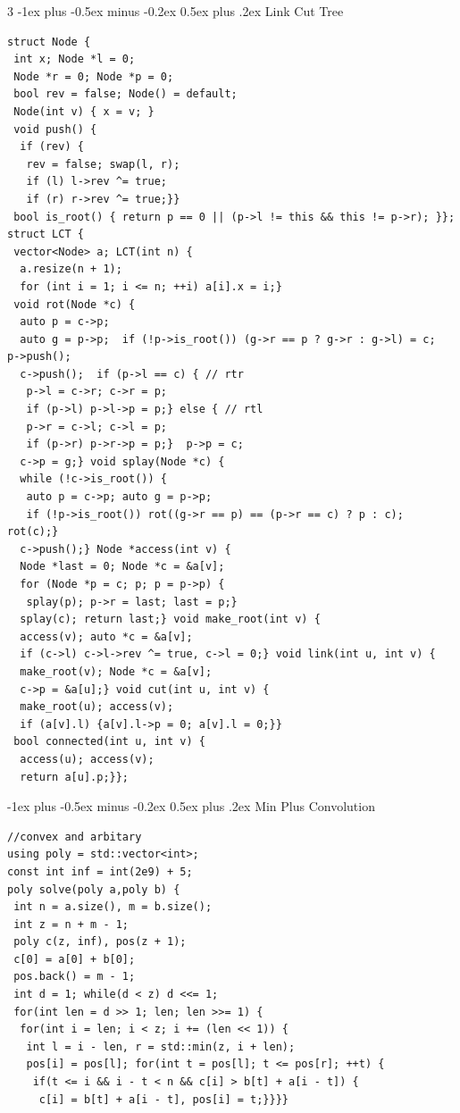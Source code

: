 \documentclass[8pt,a4paper,onesided]{article}
\makeatletter
\renewcommand{\subsection}{\@startsection{subsection}{2}{0mm}
    {-1ex plus -0.5ex minus -0.2ex} %
    {0.5ex plus .2ex}                %
    {\normalfont\large\bfseries}}    %
\makeatother
\begin{document}
\begin{multicols}{3}
\subsection{Link Cut Tree}
\begin{verbatim}
struct Node {
 int x; Node *l = 0;
 Node *r = 0; Node *p = 0;
 bool rev = false; Node() = default;
 Node(int v) { x = v; }
 void push() {
  if (rev) {
   rev = false; swap(l, r);
   if (l) l->rev ^= true;
   if (r) r->rev ^= true;}}
 bool is_root() { return p == 0 || (p->l != this && this != p->r); }};
struct LCT {
 vector<Node> a; LCT(int n) {
  a.resize(n + 1);
  for (int i = 1; i <= n; ++i) a[i].x = i;}
 void rot(Node *c) {
  auto p = c->p;
  auto g = p->p;  if (!p->is_root()) (g->r == p ? g->r : g->l) = c;  p->push();
  c->push();  if (p->l == c) { // rtr
   p->l = c->r; c->r = p;
   if (p->l) p->l->p = p;} else { // rtl
   p->r = c->l; c->l = p;
   if (p->r) p->r->p = p;}  p->p = c;
  c->p = g;} void splay(Node *c) {
  while (!c->is_root()) {
   auto p = c->p; auto g = p->p;
   if (!p->is_root()) rot((g->r == p) == (p->r == c) ? p : c); rot(c);}
  c->push();} Node *access(int v) {
  Node *last = 0; Node *c = &a[v];
  for (Node *p = c; p; p = p->p) {
   splay(p); p->r = last; last = p;}
  splay(c); return last;} void make_root(int v) {
  access(v); auto *c = &a[v];
  if (c->l) c->l->rev ^= true, c->l = 0;} void link(int u, int v) {
  make_root(v); Node *c = &a[v];
  c->p = &a[u];} void cut(int u, int v) {
  make_root(u); access(v);
  if (a[v].l) {a[v].l->p = 0; a[v].l = 0;}}
 bool connected(int u, int v) {
  access(u); access(v);
  return a[u].p;}};
\end{verbatim}
\subsection{Min Plus Convolution}
\begin{verbatim}
//convex and arbitary
using poly = std::vector<int>;
const int inf = int(2e9) + 5;
poly solve(poly a,poly b) {
 int n = a.size(), m = b.size();
 int z = n + m - 1;
 poly c(z, inf), pos(z + 1);
 c[0] = a[0] + b[0];
 pos.back() = m - 1;
 int d = 1; while(d < z) d <<= 1;
 for(int len = d >> 1; len; len >>= 1) {
  for(int i = len; i < z; i += (len << 1)) {
   int l = i - len, r = std::min(z, i + len);
   pos[i] = pos[l]; for(int t = pos[l]; t <= pos[r]; ++t) {
    if(t <= i && i - t < n && c[i] > b[t] + a[i - t]) {
     c[i] = b[t] + a[i - t], pos[i] = t;}}}}
\end{verbatim}

\end{multicols}
\end{document}
